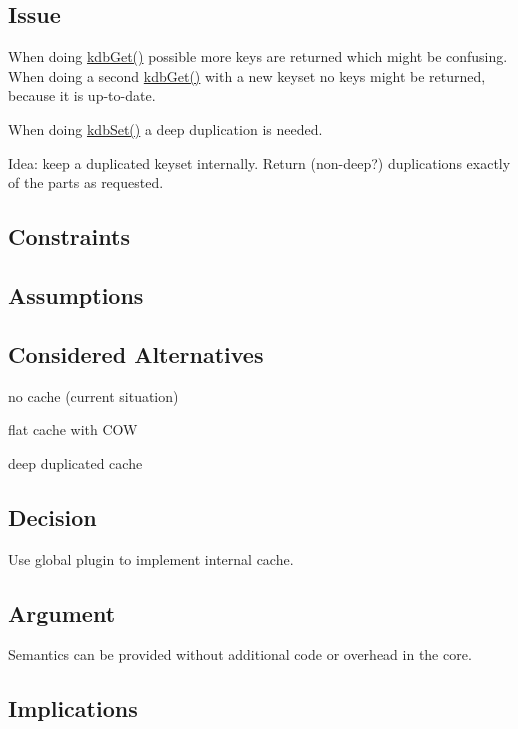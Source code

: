 \subsection*{Issue}

When doing \hyperlink{group__kdb_ga28e385fd9cb7ccfe0b2f1ed2f62453a1}{kdb\+Get()} possible more keys are returned which might be confusing. When doing a second \hyperlink{group__kdb_ga28e385fd9cb7ccfe0b2f1ed2f62453a1}{kdb\+Get()} with a new keyset no keys might be returned, because it is up-\/to-\/date.

When doing \hyperlink{group__kdb_ga11436b058408f83d303ca5e996832bcf}{kdb\+Set()} a deep duplication is needed.

Idea\+: keep a duplicated keyset internally. Return (non-\/deep?) duplications exactly of the parts as requested.

\subsection*{Constraints}

\subsection*{Assumptions}

\subsection*{Considered Alternatives}


\begin{DoxyItemize}
\item no cache (current situation)
\item flat cache with C\+OW
\item deep duplicated cache
\end{DoxyItemize}

\subsection*{Decision}

Use global plugin to implement internal cache.

\subsection*{Argument}

Semantics can be provided without additional code or overhead in the core.

\subsection*{Implications}

